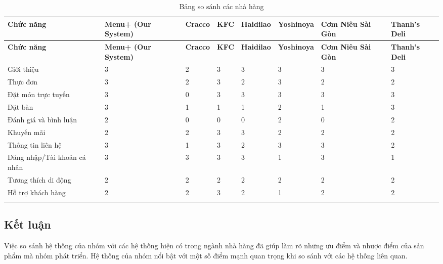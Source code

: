         \begin{longtable}{|p{2cm}|p{1.5cm}|p{1.5cm}|p{1.5cm}|p{1.5cm}|p{1.5cm}|p{1.5cm}|p{1.5cm}|}
        \hline
        \textbf{Chức năng} & \textbf{Menu+ (Our System)} & \textbf{Cracco} & \textbf{KFC} & \textbf{Haidilao} & \textbf{Yoshinoya} & \textbf{Cơm Niêu Sài Gòn} & \textbf{Thanh's Deli}\\ 
        \hline
        \endfirsthead
        \hline
        \textbf{Chức năng} & \textbf{Menu+ (Our System)} & \textbf{Cracco} & \textbf{KFC} & \textbf{Haidilao} & \textbf{Yoshinoya} & \textbf{Cơm Niêu Sài Gòn} & \textbf{Thanh's Deli} \\
        \endhead
        \hline
        \endfoot
        \hline
        \endlastfoot
        Giới thiệu & 3 & 2 & 3 & 3 & 3 & 3 & 3\\ 
        \hline
        Thực đơn & 3 & 2 & 3 & 2 & 3 & 2 & 2\\ 
        \hline
        Đặt món trực tuyến & 3 & 0 & 3 & 3 & 3 & 3 & 3\\ 
        \hline
        Đặt bàn & 3 & 1 & 1 & 1 & 2 & 1 & 3\\ 
        \hline
        Đánh giá và bình luận & 2 & 0 & 0 & 0 & 2 & 0 & 2\\ 
        \hline
        Khuyến mãi & 2 & 2 & 3 & 3 & 2 & 2 & 2\\ 
        \hline
        Thông tin liên hệ & 3 & 1 & 3 & 2 & 3 & 3 & 2\\ 
        \hline
        Đăng nhập/Tài khoản cá nhân & 3 & 3 & 3 & 3 & 1 & 3 & 1\\ 
        \hline
        Tương thích di động & 2 & 2 & 2 & 2 & 2 & 2 & 2\\ 
        \hline
        Hỗ trợ khách hàng & 2 & 2 & 3 & 2 & 1 & 2 & 2\\ 
        \hline
        \caption{Bảng so sánh các nhà hàng}\\
        \end{longtable}

\subsection{Kết luận}
Việc so sánh hệ thống của nhóm với các hệ thống hiện có trong ngành nhà hàng đã giúp làm rõ những ưu điểm và nhược điểm của sản phẩm mà nhóm phát triển. Hệ thống của nhóm nổi bật với một số điểm mạnh quan trọng khi so sánh với các hệ thống liên quan.

